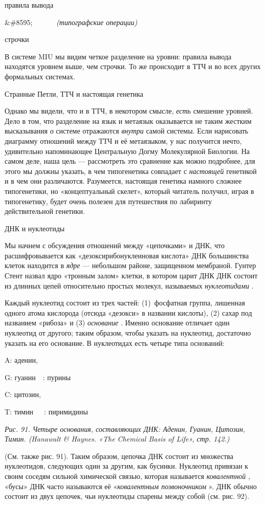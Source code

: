 \documentclass[../main.tex]{subfiles}
\begin{document}
правила вывода

\&\#8595;~~~~~~ \emph{(типографские операции)}

строчки

В системе MIU мы видим четкое разделение на уровни: правила вывода находятся уровнем выше, чем строчки. То же происходит в ТТЧ и во всех других формальных системах.

Странные Петли, ТТЧ и настоящая генетика

Однако мы видели, что и в ТТЧ, в некотором смысле, \emph{есть} смешение уровней. Дело в том, что разделение на язык и метаязык оказывается не таким жестким высказывания \emph{о} системе отражаются \emph{внутри} самой системы. Если нарисовать диаграмму отношений между ТТЧ и её метаязыком, у нас получится нечто, удивительно напоминающее Центральную Догму Молекулярной Биологии. На самом деле, наша цель --- рассмотреть это сравнение как можно подробнее, для этого мы должны указать, в чем типогенетика совпадает с \emph{настоящей} генетикой и в чем они различаются. Разумеется, настоящая генетика намного сложнее типогенетики, но «концептуальный скелет», который читатель получил, играя в типогенетику, будет очень полезен для путешествия по лабиринту действительной генетики.

ДНК и нуклеотиды

Мы начнем с обсуждения отношений между «цепочками» и ДНК, что расшифровывается как «дезоксирибонуклеиновая кислота» ДНК большинства клеток находится в \emph{ядре} --- небольшом районе, защищенном мембраной. Гунтер Стент назвал ядро «тронным залом» клетки, в котором царит ДНК ДНК состоит из длинных цепей относительно простых молекул, называемых \emph{нуклеотидами} .

Каждый нуклеотид состоит из трех частей: (1)~фосфатная группа, лишенная одного атома кислорода (отсюда «дезокси» в названии кислоты), (2) сахар под названием «рибоза» и (3) \emph{основание} . Именно основание отличает один нуклеотид от другого; таким образом, чтобы указать на нуклеотид, достаточно указать на его основание. В нуклеотидах есть четыре типа оснований:

A: аденин,

G: гуанин~~: пурины

C: цитозин,

T: тимин~~~: пиримидины

\emph{Рис. 91. Четыре основания, составляющих ДНК: Аденин, Гуанин, Цитозин, Тимин. (Hanawalt \& Haynes. «The Chemical Basis of Life», стр. 142.)}

(См. также рис. 91). Таким образом, цепочка ДНК состоит из множества нуклеотидов, следующих один за другим, как бусинки. Нуклеотид привязан к своим соседям сильной химической связью, которая называется \emph{ковалентной} , «бусы» ДНК часто называются её «\emph{ковалентным позвоночником} ». ДНК обычно состоит из двух цепочек, чьи нуклеотиды спарены между собой (см. рис. 92).
\end{document}
